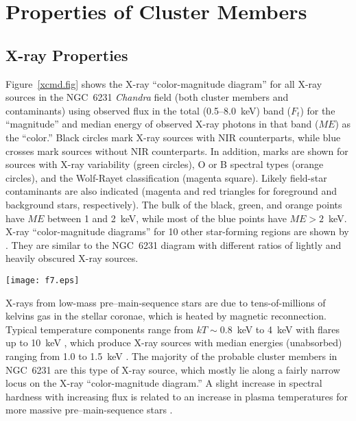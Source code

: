 \documentclass[twocolumn,tighten]{aastex61}
\begin{document}
\newpage

\section{Properties of Cluster Members\label{prop.sec}}

\subsection{X-ray Properties \label{xray2.sec}}

Figure~\ref{xcmd.fig} shows the X-ray ``color-magnitude diagram'' for all X-ray sources in the NGC~6231 {\it Chandra} field (both cluster members and contaminants) using observed flux in the total (0.5--8.0~keV) band ($F_t$) for the ``magnitude'' and median energy of observed X-ray photons in that band ($ME$) as the ``color.''  Black circles mark X-ray sources with NIR counterparts, while blue crosses mark sources without NIR counterparts. In addition, marks are shown for sources with X-ray variability (green circles), O or B spectral types (orange circles), and the Wolf-Rayet classification (magenta square). Likely field-star contaminants are also indicated (magenta and red triangles for foreground and background stars, respectively).
The bulk of the black, green, and orange points have $ME$ between 1 and 2~keV, while most of the blue points have $ME>2$~keV. 
 X-ray ``color-magnitude diagrams'' for 10 other star-forming regions are shown by \citet{2013ApJS..209...27K}.  They are similar to the NGC~6231 diagram with different ratios of lightly and heavily obscured X-ray sources. 

\begin{figure*}
\centering
\texttt{[image: f7.eps]} 
\caption{The X-ray ``color-magnitude diagram'' of NGC~6231 with total-band flux ($0.5-8.0$~keV) vs.\ total-band median energy. X-ray sources with $ZYJHK_s$ counterparts (black circles) and those without (blue crosses) are indicated. Green circles indicate that an X-ray source is variable, and orange circles indicate that it is matched to a object in a catalog of known O- and B-type cluster members. Likely field-star contaminants in the foreground (magenta triangles) and background (red triangles) are indicated. The magenta box marks the Wolf-Rayet star. \label{xcmd.fig}}
\end{figure*}


X-rays from low-mass pre--main-sequence stars are due to tens-of-millions of kelvins gas in the stellar coronae, which is heated by magnetic reconnection. Typical temperature components range from $kT\sim 0.8$~keV to 4~keV with flares up to 10~keV \citep{2005ApJS..160..319G,2008ApJ...688..418G}, which produce X-ray sources with median energies (unabsorbed) ranging from 1.0 to 1.5~keV \citep{2010ApJ...708.1760G}. The majority of the probable cluster members in NGC~6231 are this type of X-ray source, which mostly lie along a fairly narrow locus on the X-ray ``color-magnitude diagram.'' A slight increase in spectral hardness with increasing flux is related to an increase in plasma temperatures for more massive pre--main-sequence stars \citep{2010ApJ...708.1760G,2013ApJS..209...27K}.
\end{document}
